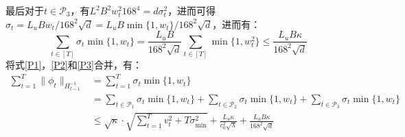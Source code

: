 \documentclass[UTF8,a4paper,10.5pt]{ctexart}
\newcommand{\Pcal}{\mathcal P}
\begin{document}
最后对于$t\in \Pcal_3$，有$L^2B^2w_t^2 168^4= d \sigma_t^2$，进而可得$\sigma_t = L_u B w_t/168^2\sqrt{d} = L_uB \min\{1,w_t\}/168^2\sqrt{d}$，进而有：
\begin{equation}
	\sum_{t\in [T]}\sigma_t\min\{1,w_t\} = \frac{L_uB}{168^2\sqrt{d}}\sum_{t\in [T]}\min\{1,w_t^2\}\leq\frac{L_uB\kappa}{168^2\sqrt{d}}
	\label{P3}
\end{equation}
将式\ref{P1}，\ref{P2}和\ref{P3}合并，有：
\begin{align*}
	\sum_{t=1}^{T} \|\phi_t\|_{H_{t-1}^{-1}} &= \sum_{t=1}^{T}\sigma_t\min\{1,w_t\}\\
	&= \sum_{t\in \Pcal_1}\sigma_t\min\{1,w_t\} + \sum_{t\in \Pcal_2}\sigma_t\min\{1,w_t\} + \sum_{t\in \Pcal_3}\sigma_t\min\{1,w_t\} \\
	&\leq \sqrt{\kappa}\cdot \sqrt{\sum_{t=1}^{T}v_t^2+T\sigma_{\min}^2} + \frac{L_u\kappa}{c_0^2\sqrt{\lambda}} + \frac{L_uB\kappa}{168^2\sqrt{d}}
\end{align*}


\pagebreak
\clearpage
{}
{}






\end{document}
